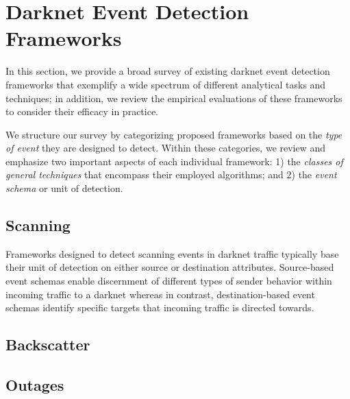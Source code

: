 \documentclass[manuscript,nonacm]{acmart}
\begin{document}



\section{Darknet Event Detection Frameworks}

In this section, we provide a broad survey of existing darknet event detection frameworks that exemplify a wide spectrum of 
different analytical tasks and techniques; in addition, we review the empirical evaluations of these frameworks to consider 
their efficacy in practice.

We structure our survey by categorizing proposed frameworks based on the \textit{type of event} they are designed to detect.
Within these categories, we review and emphasize two important aspects of each individual framework:
1) the \textit{classes of general techniques} that encompass their employed algorithms; and
2) the \textit{event schema} or unit of detection.



\subsection{Scanning}

Frameworks designed to detect scanning events in darknet traffic typically base their unit of detection on either source or destination attributes.
Source-based event schemas enable discernment of different types of sender behavior within incoming traffic to a darknet whereas in contrast, 
destination-based event schemas identify specific targets that incoming traffic is directed towards.




\subsection{Backscatter}

\subsection{Outages}
\end{document}
